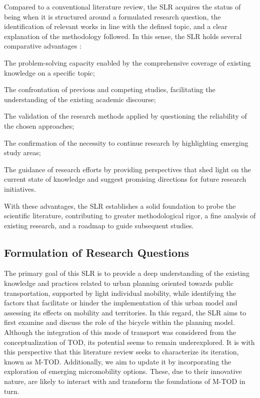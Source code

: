\begin{refsegment}
Compared to a conventional literature review, the \acrshort{SLR} acquires the status of being  when it is structured around a formulated research question, the identification of relevant works in line with the defined topic, and a clear explanation of the methodology followed. In this sense, the \acrshort{SLR} holds several comparative advantages \textcolor{blue}{\autocite[2]{transportation_research_board_of_the_national_academies_literature_2015}}:
    \begin{customitemize}
        \item The problem-solving capacity enabled by the comprehensive coverage of existing knowledge on a specific topic;
        \item The confrontation of previous and competing studies, facilitating the understanding of the existing academic discourse;
        \item The validation of the research methods applied by questioning the reliability of the chosen approaches;
        \item The confirmation of the necessity to continue research by highlighting emerging study areas;
        \item The guidance of research efforts by providing perspectives that shed light on the current state of knowledge and suggest promising directions for future research initiatives.
    \end{customitemize}
With these advantages, the \acrshort{SLR} establishes a solid foundation to probe the scientific literature, contributing to greater methodological rigor, a fine analysis of existing research, and a roadmap to guide subsequent studies.%

\subsection{Formulation of Research Questions
    \label{chap2:formulation-questions-recherche}
    }
    
The primary goal of this \acrshort{SLR} is to provide a deep understanding of the existing knowledge and practices related to urban planning oriented towards public transportation, supported by light individual mobility, while identifying the factors that facilitate or hinder the implementation of this urban model and assessing its effects on mobility and territories. In this regard, the \acrshort{SLR} aims to first examine and discuss the role of the bicycle within the planning model. Although the integration of this mode of transport was considered from the conceptualization of \acrshort{TOD}, its potential seems to remain underexplored. It is with this perspective that this literature review seeks to characterize its iteration, known as \acrshort{M-TOD}. Additionally, we aim to update it by incorporating the exploration of emerging \gls{micromobility} options. These, due to their innovative nature, are likely to interact with and transform the foundations of \acrshort{M-TOD} in turn.%


\end{refsegment}
